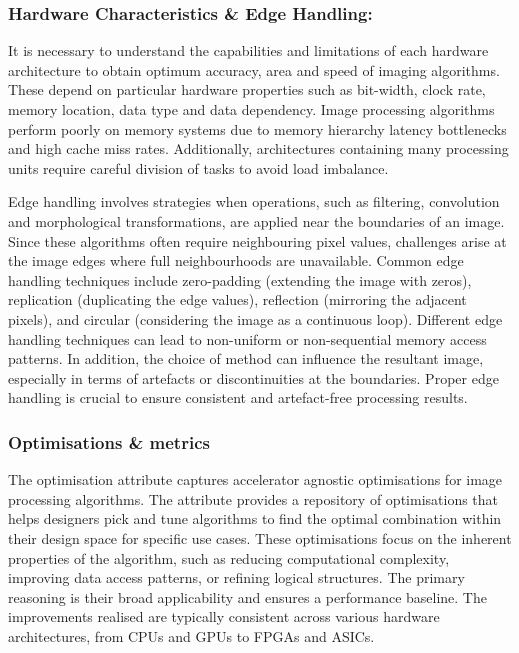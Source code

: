 \subsubsection{Hardware Characteristics \& Edge Handling:}
It is necessary to understand the capabilities and limitations of each hardware architecture to obtain optimum accuracy, area and speed of imaging algorithms. These depend on particular hardware properties such as bit-width, clock rate, memory location, data type and data dependency. Image processing algorithms perform poorly on memory systems due to memory hierarchy latency bottlenecks and high cache miss rates. Additionally, architectures containing many processing units require careful division of tasks to avoid load imbalance.

Edge handling involves strategies when operations, such as filtering, convolution and morphological transformations, are applied near the boundaries of an image. Since these algorithms often require neighbouring pixel values, challenges arise at the image edges where full neighbourhoods are unavailable. Common edge handling techniques include zero-padding (extending the image with zeros), replication (duplicating the edge values), reflection (mirroring the adjacent pixels), and circular (considering the image as a continuous loop). Different edge handling techniques can lead to non-uniform or non-sequential memory access patterns. In addition, the choice of method can influence the resultant image, especially in terms of artefacts or discontinuities at the boundaries. Proper edge handling is crucial to ensure consistent and artefact-free processing results.

\subsubsection{Optimisations \& metrics}
The optimisation attribute captures accelerator agnostic optimisations for image processing algorithms. The attribute provides a repository of optimisations that helps designers pick and tune algorithms to find the optimal combination within their design space for specific use cases. These optimisations focus on the inherent properties of the algorithm, such as reducing computational complexity, improving data access patterns, or refining logical structures. The primary reasoning is their broad applicability and ensures a performance baseline. The improvements realised are typically consistent across various hardware architectures, from CPUs and GPUs to FPGAs and ASICs. 

